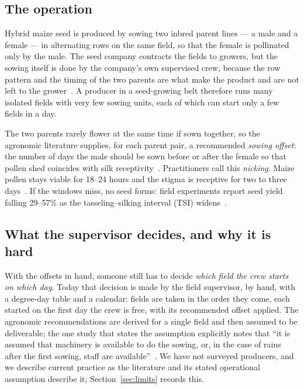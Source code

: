 \documentclass[10pt,twocolumn]{article}
\begin{document}
\subsection{The operation}

Hybrid maize seed is produced by sowing two inbred parent lines --- a male
and a female --- in alternating rows on the same field, so that the female
is pollinated only by the male. The seed company contracts the fields to
growers, but the sowing itself is done by the company's own supervised crew,
because the row pattern and the timing of the two parents are what make the
product and are not left to the grower~\cite{chassaigne2021,chassaigne2020}.
A producer in a seed-growing belt therefore runs many isolated fields with
very few sowing units, each of which can start only a few fields in a day.

The two parents rarely flower at the same time if sown together, so the
agronomic literature supplies, for each parent pair, a recommended
\emph{sowing offset}: the number of days the male should be sown before or
after the female so that pollen shed coincides with silk
receptivity~\cite{marahatta2025,chassaigne2021,asefa2024}. Practitioners call
this \emph{nicking}. Maize pollen stays viable for 18--24 hours and the stigma
is receptive for two to three days~\cite{marahatta2025}. If the windows miss,
no seed forms: field experiments report seed yield falling 29--57\% as the
tasseling--silking interval (TSI) widens~\cite{marahatta2025}.

\subsection{What the supervisor decides, and why it is hard}

With the offsets in hand, someone still has to decide \emph{which field the
crew starts on which day}. Today that decision is made by the field
supervisor, by hand, with a degree-day table and a calendar: fields are
taken in the order they come, each started on the first day the crew is
free, with its recommended offset applied. The agronomic recommendations
are derived for a single field and then assumed to be deliverable; the one
study that states the assumption explicitly notes that ``it is assumed that
machinery is available to do the sowing, or, in the case of rains after the
first sowing, staff are available''~\cite{chassaigne2021}. We have not
surveyed producers, and we describe current practice as the literature and
its stated operational assumption describe it; Section~\ref{sec:limits}
records this.
\end{document}
